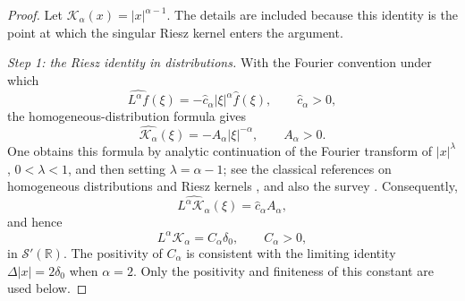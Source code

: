 \documentclass[10pt,a4paper]{amsart}
\newcommand{\R}{\mathbb{R}}
\newcommand{\1}{\mathbf{1}}
\newcommand{\RieszK}{\mathcal K_\alpha}
\begin{document}
\begin{proof}
Let $\RieszK(x)=|x|^{\alpha-1}$. The details are included because this identity is the point at which the singular Riesz kernel enters the argument.

\emph{Step 1: the Riesz identity in distributions.} With the Fourier convention under which
\[
  \widehat{L^\alpha f}(\xi)=-\widehat c_\alpha |\xi|^\alpha\widehat f(\xi),
  \qquad \widehat c_\alpha>0,
\]
the homogeneous-distribution formula gives
\[
  \widehat{\RieszK}(\xi)=-A_\alpha |\xi|^{-\alpha},
  \qquad A_\alpha>0.
\]
One obtains this formula by analytic continuation of the Fourier transform of $|x|^\lambda$, $0<\lambda<1$, and then setting $\lambda=\alpha-1$; see the classical references on homogeneous distributions and Riesz kernels \cite{GelfandShilov1964,Landkof1972}, and also the survey \cite{Kwasnicki2017}. Consequently,
\[
  \widehat{L^\alpha\RieszK}(\xi)=\widehat c_\alpha A_\alpha,
\]
and hence
\begin{equation}\label{eq:riesz-identity}
  L^\alpha\RieszK=C_\alpha\delta_0,
  \qquad C_\alpha>0,
\end{equation}
in $\mathcal S'(\R)$. The positivity of $C_\alpha$ is consistent with the limiting identity $\Delta |x|=2\delta_0$ when $\alpha=2$. Only the positivity and finiteness of this constant are used below.


\end{proof}
\end{document}
